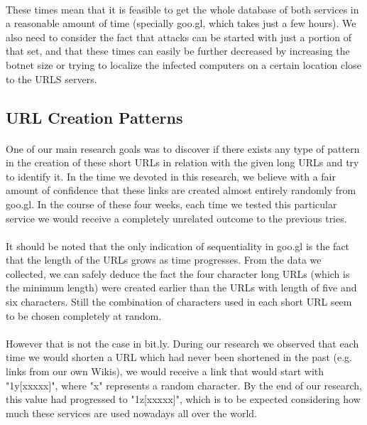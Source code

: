 \documentclass[12pt]{article}
\begin{document}
\paragraph{}
These times mean that it is feasible to get the whole database of both services in a reasonable amount of time (specially goo.gl, which takes just a few hours). We also need to consider the fact that attacks can be started with just a portion of that set, and that these times can easily be further decreased by increasing the botnet size or trying to localize the infected computers on a certain location close to the URLS servers.

\subsection{URL Creation Patterns}

\paragraph{}
 One of our main research goals was to discover if there exists any type of pattern in the creation of these short URLs in relation with the given long URLs and try to identify it. In the time we devoted in this research, we believe with a fair amount of confidence that these links are created almost entirely randomly from goo.gl. In the course of these four weeks, each time we tested this particular service we would receive a completely unrelated outcome to the previous tries.
 
\paragraph{}
 It should be noted that the only indication of sequentiality in goo.gl is the fact that the length of the URLs grows as time progresses. From the data we collected, we can safely deduce the fact the four character long URLs (which is the minimum length) were created earlier than the URLs with length of five and six characters. Still the combination of characters used in each short URL seem to be chosen completely at random. 
 
\paragraph{}
 However that is not the case in bit.ly. During our research we observed that each time we would shorten a URL which had never been shortened in the past (e.g. links from our own Wikis), we would receive a link that would start with "1y[xxxxx]", where "x" represents a random character. By the end of our research, this value had progressed to "1z[xxxxx]", which is to be expected considering how much these services are used nowadays all over the world.
 
\end{document}
